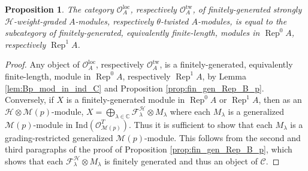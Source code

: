 \documentclass[11pt, reqno]{amsart}
\newtheorem{prop}[thm]{Proposition}
\theoremstyle{definition}\newtheorem{defi}[thm]{Definition}
\theoremstyle{definition}\newtheorem{rem}[thm]{Remark}
\theoremstyle{definition}\newtheorem{exam}[thm]{Example}
\theoremstyle{definition}\newtheorem{assum}[thm]{Assumption}
\newcommand{\cH}{\mathcal{H}}
\newcommand{\cM}{\mathcal{M}}
\newcommand{\cF}{\mathcal{F}}
\newcommand{\cO}{\mathcal{O}}
\newcommand{\cC}{\mathcal{C}}
\newcommand{\CC}{\mathbb{C}}
\newcommand{\ind}{\mathrm{Ind}}
\newcommand{\Oloc}{\cO^{\mathrm{loc}}}
\newcommand{\Otw}{\cO^{\mathrm{tw}}}
\DeclareMathOperator{\rep}{Rep}
\begin{document}
\begin{prop}\label{prop:OlocA_OtwA_characterization}
 The category $\Oloc_A$, respectively $\Otw_A$, of finitely-generated strongly $\cH$-weight-graded $A$-modules, respectively $\theta$-twisted $A$-modules, is equal to the subcategory of finitely-generated, equivalently finite-length, modules in $\rep^0A$, respectively $\rep^1A$.
\end{prop}




\begin{proof}
Any object of $\Oloc_A$, respectively $\Otw_A$, is a finitely-generated, equivalently finite-length, module in $\rep^0A$, respectively $\rep^1A$, by Lemma \ref{lem:Bp_mod_in_ind_C} and Proposition \ref{prop:fin_gen_Rep_B_p}.
Conversely, if $X$ is a finitely-generated module in $\rep^0A$ or $\rep^1A$, then as an $\cH\otimes\cM(p)$-module, $X=\bigoplus_{\lambda\in\CC}\cF_\lambda^\cH\otimes M_\lambda$ where each $M_\lambda$ is a generalized $\cM(p)$-module in $\ind(\cO_{\cM(p)}^T)$. Thus it is sufficient to show that each $M_\lambda$ is a grading-restricted generalized $\cM(p)$-module. This follows from the second and third paragraphs of the proof of Proposition \ref{prop:fin_gen_Rep_B_p}, which shows that each $\cF^\cH_\lambda\otimes M_\lambda$ is finitely generated and thus an object of $\cC$.
\end{proof}
\end{document}
